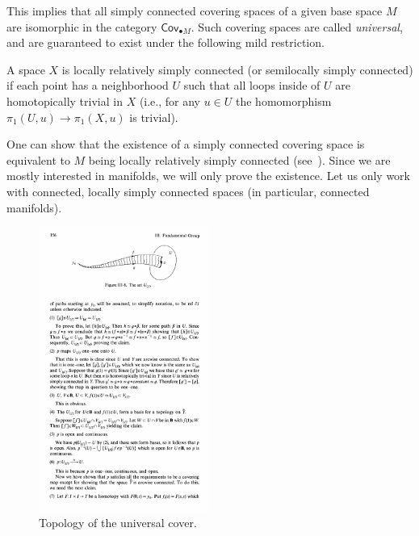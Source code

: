 This implies that all simply connected covering spaces of a given base space $M$ are isomorphic in the category $\mathsf{Cov}_{\bullet M}$. Such covering spaces are called \emph{universal}, and are guaranteed to exist under the following mild restriction.

\begin{defn}
    A space $X$ is locally relatively simply connected (or semilocally simply connected) if each point has a neighborhood $U$ such that all loops inside of $U$ are homotopically trivial in $X$ (i.e., for any $u\in U$ the homomorphism $\pi_1(U,u)\to \pi_1(X,u)$ is trivial).
\end{defn}

One can show that the existence of a simply connected covering space is equivalent to $M$ being locally relatively simply connected (see~\cite[Theorem~8.4]{Bredon}). Since we are mostly interested in manifolds, we will only prove the existence. Let us only work with connected, locally simply connected spaces (in particular, connected manifolds).

\begin{figure}[tp]
    \centering
    \includegraphics[width=0.5\textwidth]{figures/uni_open_set.pdf}
    \caption{Topology of the universal cover.\label{fig univ cover}}
\end{figure}

